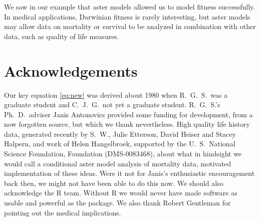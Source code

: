 We saw in our example that aster models allowed us to model fitness
successfully.
In medical applications, Darwinian fitness is rarely interesting,
but aster models may allow data on mortality or survival to be analyzed
in combination with other data, such as quality of life measures.

\section*{Acknowledgements}

Our key equation \eqref{eq:new} was derived about
1980 when R.~G.~S.\ was a graduate student and C.~J.~G.\ not yet
a graduate student.  R.~G.~S.'s Ph.~D.\ adviser Janis Antonovics
provided some funding for development, from a now forgotten source, but
which we thank nevertheless.
High quality life history data, generated recently by S.~W., Julie Etterson,
David Heiser and Stacey Halpern, and work of Helen Hangelbroek,
supported by the U.~S.\ National Science
{Foundation,}
{Foundation (DMS-0083468),}
about what in hindsight we would call
a conditional aster model analysis of mortality data,
motivated implementation of these ideas. 
Were it not for Janis's enthusiastic encouragement back then,
we might not have been able to do this now.  We should also acknowledge
the R team.  Without R we would never have made software as usable and
powerful as the \verb@aster@ package.  We also thank Robert Gentleman
for pointing out the medical implications.


